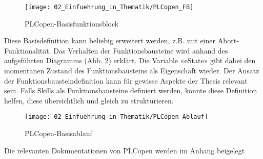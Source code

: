 	\newpage
	
	\begin{figure}[h!]
		\centering
		\texttt{[image: 02\_Einfuehrung\_in\_Thematik/PLCopen\_FB]}
		\captionsetup{justification=centering}
		\caption{PLCopen-Basisfunktionsblock}
		\label{fig:PLCopen_FB}
	\end{figure}
	
	Diese Basisdefinition kann beliebig erweitert werden, z.B. mit einer Abort-Funktionalität. Das Verhalten der Funktionsbausteine wird anhand des aufgeführten Diagramms (Abb. \ref{fig:PLCopen_Ablauf}) erklärt. Die Variable «eState» gibt dabei den momentanen Zustand des Funktionsbausteins als Eigenschaft wieder.
	Der Ansatz der Funktionsbausteindefinition kann für gewisse Aspekte der Thesis relevant sein. Falls Skills als Funktionsbausteine definiert werden, könnte diese Definition helfen, diese übersichtlich und gleich zu strukturieren. 
	
	\begin{figure}[h!]
		\centering
		\texttt{[image: 02\_Einfuehrung\_in\_Thematik/PLCopen\_Ablauf]}
		\captionsetup{justification=centering}
		\caption{PLCopen-Basisablauf}
		\label{fig:PLCopen_Ablauf}
	\end{figure}
	
	\begin{bfhNoteBox}
		Die relevanten Dokumentationen von PLCopen werden im Anhang beigelegt
	\end{bfhNoteBox} 
	
	\newpage
	
	
	